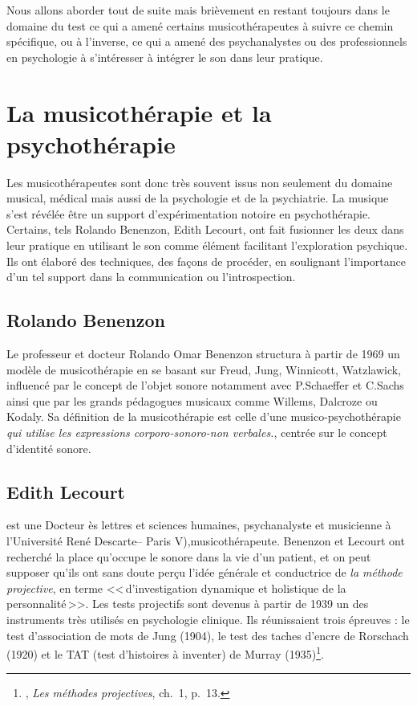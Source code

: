  
 Nous allons aborder tout de suite mais brièvement en restant toujours dans le domaine du test ce qui a amené certains musicothérapeutes à suivre ce chemin spécifique, ou à  l'inverse, ce qui a amené des psychanalystes ou des professionnels en psychologie à s'intéresser à intégrer le son dans leur pratique.
 
 
 
\section{La musicothérapie et la psychothérapie}
\label{musicothEtpsycho}

	 Les musicothérapeutes sont donc très souvent  issus non seulement du domaine musical, médical mais aussi  de  la psychologie et de la psychiatrie. La musique s'est révélée être  un support d'expérimentation notoire en psychothérapie. Certains, tels Rolando Benenzon, Edith Lecourt,  ont fait fusionner les deux dans leur pratique  en utilisant le son comme élément facilitant l'exploration psychique. Ils ont élaboré des techniques, des façons de procéder, en soulignant l'importance d'un tel support dans la  communication ou l'introspection.
	 
	  \subsection{Rolando Benenzon} 
	  
	  \label{benenzon}
	  Le professeur et docteur Rolando Omar Benenzon structura à partir de 1969 un modèle de musicothérapie en se basant sur Freud, Jung, Winnicott, Watzlawick, influencé par le concept de l'objet sonore notamment avec P.Schaeffer et C.Sachs ainsi que par les grands pédagogues musicaux comme Willems, Dalcroze ou Kodaly. Sa définition de la musicothérapie est celle d'une musico-psychothérapie  \emph{\textsl{qui utilise les expressions corporo-sonoro-non verbales.}}, centrée sur le concept d'identité sonore.

        \subsection{Edith Lecourt}{} est une Docteur ès lettres et sciences humaines, psychanalyste et musicienne à l'Université René Descarte-- Paris V),musicothérapeute.
        Benenzon et Lecourt ont  recherché la place qu'occupe le sonore dans la vie d'un patient, et on peut supposer qu'ils ont sans doute perçu l'idée générale et conductrice de \emph{la méthode projective}, en terme 
	    <<\,d'investigation dynamique et holistique de la
        personnalité\,>>. Les tests projectifs sont devenus à partir
        de 1939 un des instruments très utilisés en psychologie
        clinique. Ils réunissaient trois épreuves : le test
        d'association de mots de Jung (1904), le test des taches
        d'encre de Rorschach (1920) et le TAT (test d'histoires à
        inventer) de Murray (1935)\footnote{\cite{anzieu.chabert:methodes}, \emph{Les méthodes projectives}, ch.~1, p.~13.}.
		

